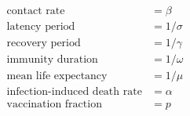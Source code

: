 \begin{align*}

\textrm{contact rate} &= \beta

\\

\textrm{latency period} &= 1/\sigma

\\

\textrm{recovery period} &= 1/\gamma

\\

\textrm{immunity duration} &= 1/\omega

\\

\textrm{mean life expectancy} &= 1/\mu

\\

\textrm{infection-induced death rate} &= \alpha

\\

\textrm{vaccination fraction} &= p



\end{align*}